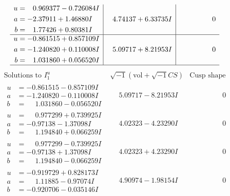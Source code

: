 \documentclass[1p]{elsarticle_modified}
\theoremstyle{definition}
\newcommand{\I}{\sqrt{-1}}
\begin{document}
$$\begin{array}{c|c|c}
\begin{aligned}
u &= \phantom{-}0.969377 - 0.726084 I \\
a &= -2.37911 + 1.46880 I \\
b &= \phantom{-}1.77426 + 0.80381 I\end{aligned}
 & \phantom{-}4.74137 + 6.33735 I & \phantom{-0.000000 } 0 \\ \hline\begin{aligned}
u &= -0.861515 + 0.857109 I \\
a &= -1.240820 + 0.110008 I \\
b &= \phantom{-}1.031860 + 0.056520 I\end{aligned}
 & \phantom{-}5.09717 + 8.21953 I & \phantom{-0.000000 } 0\\
 \hline 
 \end{array}$$\newpage$$\begin{array}{c|c|c}  
\text{Solutions to }I^u_{1}& \I (\text{vol} + \sqrt{-1}CS) & \text{Cusp shape}\\
 \hline 
\begin{aligned}
u &= -0.861515 - 0.857109 I \\
a &= -1.240820 - 0.110008 I \\
b &= \phantom{-}1.031860 - 0.056520 I\end{aligned}
 & \phantom{-}5.09717 - 8.21953 I & \phantom{-0.000000 } 0 \\ \hline\begin{aligned}
u &= \phantom{-}0.977299 + 0.739925 I \\
a &= -0.97138 - 1.37098 I \\
b &= \phantom{-}1.194840 + 0.066259 I\end{aligned}
 & \phantom{-}4.02323 - 4.23290 I & \phantom{-0.000000 } 0 \\ \hline\begin{aligned}
u &= \phantom{-}0.977299 - 0.739925 I \\
a &= -0.97138 + 1.37098 I \\
b &= \phantom{-}1.194840 - 0.066259 I\end{aligned}
 & \phantom{-}4.02323 + 4.23290 I & \phantom{-0.000000 } 0 \\ \hline\begin{aligned}
u &= -0.919729 + 0.828173 I \\
a &= \phantom{-}1.11885 - 0.97074 I \\
b &= -0.920706 - 0.035146 I\end{aligned}
 & \phantom{-}4.90974 - 1.98154 I & \phantom{-0.000000 } 0 \\ \hline\begin{aligned}

\end{aligned}
\end{array}$$
\end{document}
